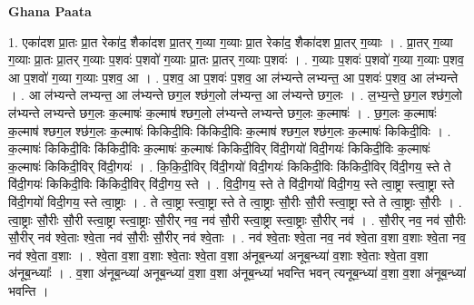 \documentclass[17pt]{extarticle}
\begin{document}
\textbf{Ghana Paata } \newline

1. एका॑दश प्रा॒तः प्रा॒त रेका॑द॒ शैका॑दश प्रा॒तर् ग॒व्या ग॒व्याः प्रा॒त रेका॑द॒ शैका॑दश प्रा॒तर् ग॒व्याः । . प्रा॒तर् ग॒व्या ग॒व्याः प्रा॒तः प्रा॒तर् ग॒व्याः प॒शवः॑ प॒शवो॑ ग॒व्याः प्रा॒तः प्रा॒तर् ग॒व्याः प॒शवः॑ । . ग॒व्याः प॒शवः॑ प॒शवो॑ ग॒व्या ग॒व्याः प॒शव॒ आ प॒शवो॑ ग॒व्या ग॒व्याः प॒शव॒ आ । . प॒शव॒ आ प॒शवः॑ प॒शव॒ आ ल॑भ्यन्ते लभ्यन्त॒ आ प॒शवः॑ प॒शव॒ आ ल॑भ्यन्ते । . आ ल॑भ्यन्ते लभ्यन्त॒ आ ल॑भ्यन्ते छग॒ल श्छ॑ग॒लो ल॑भ्यन्त॒ आ ल॑भ्यन्ते छग॒लः । . ल॒भ्य॒न्ते॒ छ॒ग॒ल श्छ॑ग॒लो ल॑भ्यन्ते लभ्यन्ते छग॒लः क॒ल्माषः॑ क॒ल्माष॑ श्छग॒लो ल॑भ्यन्ते लभ्यन्ते छग॒लः क॒ल्माषः॑ । . छ॒ग॒लः क॒ल्माषः॑ क॒ल्माष॑ श्छग॒ल श्छ॑ग॒लः क॒ल्माषः॑ किकिदी॒विः कि॑किदी॒विः क॒ल्माष॑ श्छग॒ल श्छ॑ग॒लः क॒ल्माषः॑ किकिदी॒विः । . क॒ल्माषः॑ किकिदी॒विः कि॑किदी॒विः क॒ल्माषः॑ क॒ल्माषः॑ किकिदी॒विर् वि॑दी॒गयो॑ विदी॒गयः॑ किकिदी॒विः क॒ल्माषः॑ क॒ल्माषः॑ किकिदी॒विर् वि॑दी॒गयः॑ । . कि॒कि॒दी॒विर् वि॑दी॒गयो॑ विदी॒गयः॑ किकिदी॒विः कि॑किदी॒विर् वि॑दी॒गय॒ स्ते ते वि॑दी॒गयः॑ किकिदी॒विः कि॑किदी॒विर् वि॑दी॒गय॒ स्ते । . वि॒दी॒गय॒ स्ते ते वि॑दी॒गयो॑ विदी॒गय॒ स्ते त्वा॒ष्ट्रा स्त्वा॒ष्ट्रा स्ते वि॑दी॒गयो॑ विदी॒गय॒ स्ते त्वा॒ष्ट्राः । . ते त्वा॒ष्ट्रा स्त्वा॒ष्ट्रा स्ते ते त्वा॒ष्ट्राः सौ॒रीः सौ॒री स्त्वा॒ष्ट्रा स्ते ते त्वा॒ष्ट्राः सौ॒रीः । . त्वा॒ष्ट्राः सौ॒रीः सौ॒री स्त्वा॒ष्ट्रा स्त्वा॒ष्ट्राः सौ॒रीर् नव॒ नव॑ सौ॒री स्त्वा॒ष्ट्रा स्त्वा॒ष्ट्राः सौ॒रीर् नव॑ । . सौ॒रीर् नव॒ नव॑ सौ॒रीः सौ॒रीर् नव॑ श्वे॒ताः श्वे॒ता नव॑ सौ॒रीः सौ॒रीर् नव॑ श्वे॒ताः । . नव॑ श्वे॒ताः श्वे॒ता नव॒ नव॑ श्वे॒ता व॒शा व॒शाः श्वे॒ता नव॒ नव॑ श्वे॒ता व॒शाः । . श्वे॒ता व॒शा व॒शाः श्वे॒ताः श्वे॒ता व॒शा अ॑नूब॒न्ध्या॑ अनूब॒न्ध्या॑ व॒शाः श्वे॒ताः श्वे॒ता व॒शा अ॑नूब॒न्ध्याः᳚ । . व॒शा अ॑नूब॒न्ध्या॑ अनूब॒न्ध्या॑ व॒शा व॒शा अ॑नूब॒न्ध्या॑ भवन्ति भवन् त्यनूब॒न्ध्या॑ व॒शा व॒शा अ॑नूब॒न्ध्या॑ भवन्ति । \newline
\end{document}
